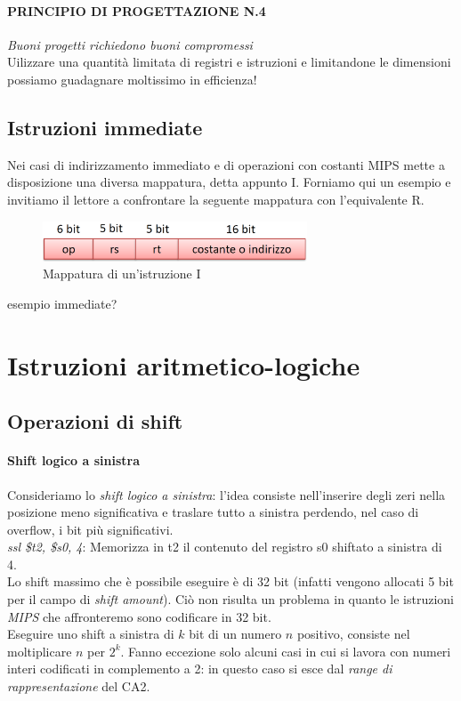 \documentclass[class=book, crop=false]{standalone}
\begin{document}
\paragraph{PRINCIPIO DI PROGETTAZIONE N.4}
\emph{Buoni progetti richiedono buoni compromessi}\\

Uilizzare una quantità limitata di registri e istruzioni e limitandone le dimensioni possiamo guadagnare moltissimo in efficienza!

\subsection{Istruzioni immediate}
Nei casi di indirizzamento immediato e di operazioni con costanti MIPS mette a disposizione una diversa mappatura, detta appunto I. Forniamo qui un esempio e invitiamo il lettore a confrontare la seguente mappatura con l'equivalente R.
\begin{figure}[H]
	\centering
	\includegraphics[width=0.7\textwidth,keepaspectratio]{I.png}
	\caption{Mappatura di un'istruzione I}
\end{figure}

esempio immediate?

\section{Istruzioni aritmetico-logiche}

\subsection{Operazioni di shift}

\paragraph{Shift logico a sinistra}
Consideriamo lo \emph{shift logico a sinistra}: l'idea consiste nell'inserire degli zeri nella posizione meno significativa e traslare tutto a sinistra perdendo, nel caso di overflow, i bit più significativi.\\
\emph{ssl \$t2, \$s0, 4}: Memorizza in t2 il contenuto del registro s0 shiftato a sinistra di 4.\\
Lo shift massimo che è possibile eseguire è di 32 bit (infatti vengono allocati 5 bit per il campo di \emph{shift amount}). Ciò non risulta un problema in quanto le istruzioni \emph{MIPS} che affronteremo sono codificare in 32 bit.\\
Eseguire uno shift a sinistra di \(k\) bit di un numero \(n\) positivo, consiste nel moltiplicare \(n\) per \(2^k\). Fanno eccezione solo alcuni casi in cui si lavora con numeri interi codificati in complemento a 2: in questo caso si esce dal \emph{range di rappresentazione} del CA2.
\end{document}
